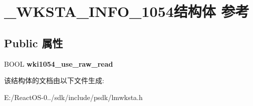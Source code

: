 \hypertarget{struct___w_k_s_t_a___i_n_f_o__1054}{}\section{\+\_\+\+W\+K\+S\+T\+A\+\_\+\+I\+N\+F\+O\+\_\+1054结构体 参考}
\label{struct___w_k_s_t_a___i_n_f_o__1054}
\subsection*{Public 属性}
\begin{DoxyCompactItemize}
\item 
\mbox{\label{struct___w_k_s_t_a___i_n_f_o__1054_a494046cc9cd3412779c0962d7f96af9d}} 
B\+O\+OL {\bfseries wki1054\+\_\+use\+\_\+raw\+\_\+read}
\end{DoxyCompactItemize}


该结构体的文档由以下文件生成\+:\begin{DoxyCompactItemize}
\item 
E\+:/\+React\+O\+S-\/0../sdk/include/psdk/lmwksta.\+h\end{DoxyCompactItemize}
